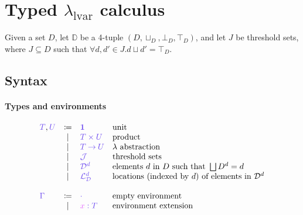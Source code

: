 \documentclass[main.tex]{subfiles}
\begin{document}
\section{Typed $\lambda_{\text{lvar}}$ calculus}

Given a set $D$, let $\mathbb{D}$ be a 4-tuple $(D, \sqcup_{D}, \bot_{D},
\top_{D})$, and let $J$ be threshold sets, where $J \subseteq D$ such that  
$\forall d, d' \in J. d \sqcup d' = \top_{D}$.

\subsection{Syntax}
\label{sec:llam-syntax}

\paragraph{Types and environments}
\[
\begin{array}{lcll}
  \ty{T}, \ty{U}
  & \coloneqq & \ty{\tyunit}        & \text{unit} \\
  & \sep      & \ty{\typrod{T}{U}}  & \text{product} \\
  & \sep      & \ty{\tyfun{T}{U}}   & \lambda \text{ abstraction}\\
  & \sep      & \ty{\tyJ}           & \text{threshold sets} \\
  & \sep      & \ty{\tyD{d}}        & \text{elements } d \text{ in } D \text{ such
                                      that } \bigsqcup D^{d} = d \\
  & \sep      & \ty{\tyL{d}}        & \text{locations (indexed by } d \text{) of
                                      elements in } \tyD{d}\\
  \\
  \ty{\Gamma}
  & \coloneqq & \ty{\emptyenv}                 & \text{empty environment}\\
  & \sep      & \ty{\tmty{x}{T}}               & \text{environment extension} \\
\end{array}
\]
\end{document}
